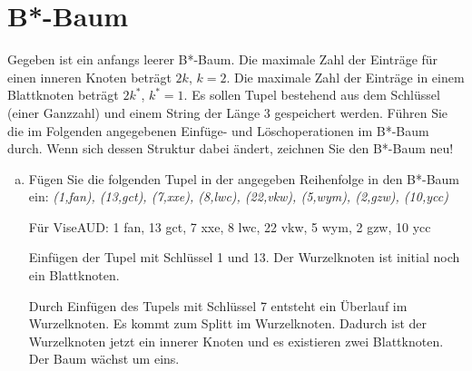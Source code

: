\section{B*-Baum}
\label{B*}

Gegeben ist ein anfangs leerer B*-Baum. Die maximale Zahl der Einträge für einen inneren Knoten beträgt $2k$, $k = 2$. Die maximale Zahl der Einträge in einem Blattknoten beträgt $2k^*$, $k^* = 1$. Es sollen Tupel bestehend aus dem Schlüssel (einer Ganzzahl) und einem String der Länge $3$ gespeichert werden. Führen Sie die im Folgenden angegebenen Einfüge- und Löschoperationen im B*-Baum durch. Wenn sich dessen Struktur dabei ändert, zeichnen Sie den B*-Baum neu!

\begin{enumerate}[a)]
  \item Fügen Sie die folgenden Tupel in der angegeben Reihenfolge in den B*-Baum ein: \textit{(1,fan), (13,gct), (7,xxe), (8,lwc), (22,vkw), (5,wym), (2,gzw), (10,ycc)}

	\begin{solution}
Für ViseAUD: 1 fan, 13 gct, 7 xxe, 8 lwc, 22 vkw, 5 wym, 2 gzw, 10 ycc

Einfügen der Tupel mit Schlüssel 1 und 13. Der Wurzelknoten ist initial noch ein Blattknoten.

	\begin{center}
  \end{center}

Durch Einfügen des Tupels mit Schlüssel 7 entsteht ein Überlauf im Wurzelknoten.
Es kommt zum Splitt im Wurzelknoten.
Dadurch ist der Wurzelknoten jetzt ein innerer Knoten und es existieren zwei Blattknoten.
Der Baum wächst um eins.

	\begin{center}
\end{center}
\end{solution}
\end{enumerate}

